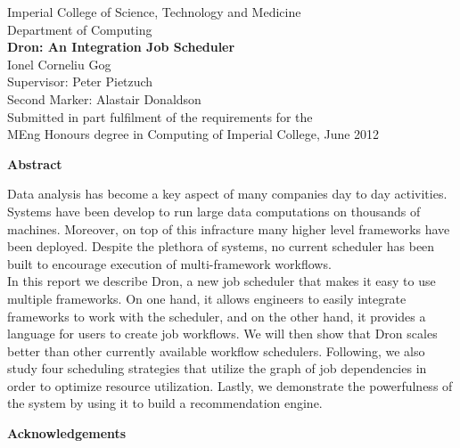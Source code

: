\documentclass[11pt,a4paper,twoside]{report}
\begin{document}
\begin{titlepage}
\thispagestyle{empty}

\begin{center}
\Large{Imperial College of Science, Technology and Medicine}\\
\Large{Department of Computing}\\[5.0cm]

\Huge{\textbf{Dron: An Integration Job Scheduler}}\\[1.0cm]
\Huge{Ionel Corneliu Gog}\\[0.5cm]
\normalsize{Supervisor: Peter Pietzuch}\\
\normalsize{Second Marker: Alastair Donaldson}\\[8.0cm]

\normalsize{Submitted in part fulfilment of the requirements for the}\\
\normalsize{MEng Honours degree in Computing of Imperial College, June 2012}
\end{center}
\end{titlepage}

\newpage
\thispagestyle{empty}
\mbox{}
\newpage
\thispagestyle{plain}
\begin{center}
\large{\textbf{Abstract}}
\end{center}
\normalsize{}
\vspace{1.5cm}
\noindent
Data analysis has become a key aspect of many companies day to day activities. Systems have been develop to run large data computations on thousands of machines. Moreover, on top of this infracture many higher level frameworks have been deployed. Despite the plethora of systems, no current scheduler has been built to encourage execution of multi-framework workflows.\\

\noindent
In this report we describe Dron, a new job scheduler that makes it easy to use multiple frameworks. On one hand, it allows engineers to easily integrate frameworks to work with the scheduler, and on the other hand, it provides a language for users to create job workflows. We will then show that Dron scales better than other currently available workflow schedulers. Following, we also study four scheduling strategies that utilize the graph of job dependencies in order to optimize resource utilization. Lastly, we demonstrate the powerfulness of the system by using it to build a recommendation engine.


\newpage
\thispagestyle{empty}
\mbox{}
\newpage
\thispagestyle{plain}
\begin{center}
\large{\textbf{Acknowledgements}}
\end{center}
\normalsize{}
\end{document}
